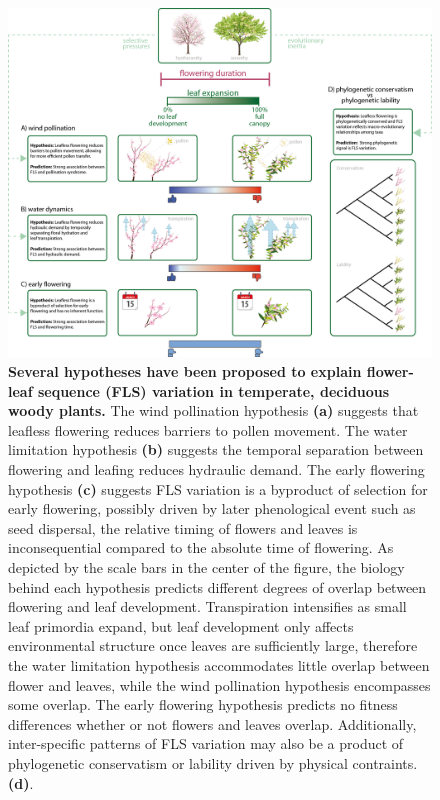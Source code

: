 \documentclass[11pt]{article}
\begin{document}
{\begin{figure}[h!]
    \centering
 \includegraphics[width=\textwidth]{..//..//HarvardForest/concept_hystheranty_wide_text_overlaps.png}  
    \caption{\textbf{Several hypotheses have been proposed to explain flower-leaf sequence (FLS) variation in temperate, deciduous woody plants.}  The wind pollination hypothesis \textbf{(a)} suggests that leafless flowering reduces barriers to pollen movement. The water limitation hypothesis \textbf{(b)} suggests the temporal separation between flowering and leafing reduces hydraulic demand. The early flowering hypothesis \textbf{(c)} suggests FLS variation is a byproduct of selection for early flowering, possibly driven by later phenological event such as seed dispersal, the relative timing of flowers and leaves is inconsequential compared to the absolute time of flowering. As depicted by the scale bars in the center of the figure, the biology behind each hypothesis predicts different degrees of overlap between flowering and leaf development. Transpiration intensifies as small leaf primordia expand, but leaf development only affects environmental structure once leaves are sufficiently large, therefore the water limitation hypothesis accommodates little overlap between flower and leaves, while the wind pollination hypothesis encompasses some overlap. The early flowering hypothesis predicts no fitness differences whether or not flowers and leaves overlap. Additionally, inter-specific patterns of FLS variation may also be a product of phylogenetic conservatism or lability driven by physical contraints. \textbf{(d)}.}
    \label{fig:conceptual}
\end{figure}
 
}
\end{document}
